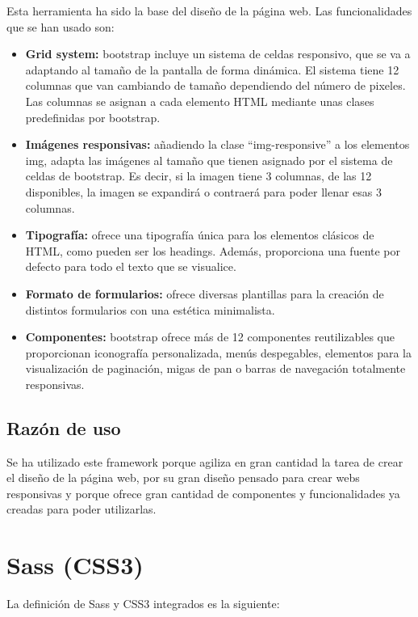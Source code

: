 Esta herramienta ha sido la base del diseño de la página web. Las funcionalidades que se han usado son:
\begin{itemize}
	\item \textbf{Grid system:} bootstrap incluye un sistema de celdas responsivo, que se va a adaptando al tamaño de la pantalla de forma dinámica. El sistema tiene 12 columnas que van cambiando de tamaño dependiendo del número de pixeles. Las columnas se asignan a cada elemento HTML mediante unas clases predefinidas por bootstrap. 	
	\item \textbf{Imágenes responsivas:} añadiendo la clase “img-responsive” a los elementos img, adapta las imágenes al tamaño que tienen asignado por el sistema de celdas de	bootstrap. Es decir, si la imagen tiene 3 columnas, de las 12 disponibles, la imagen se	expandirá o contraerá para poder llenar esas 3 columnas.
	\item \textbf{Tipografía:} ofrece una tipografía única para los elementos clásicos de HTML, como pueden ser los headings. Además, proporciona una fuente por defecto para todo el texto que se visualice.
	\item \textbf{Formato de formularios:} ofrece diversas plantillas para la creación de distintos formularios con una estética minimalista.
	\item \textbf{Componentes:} bootstrap ofrece más de 12 componentes reutilizables que proporcionan iconografía personalizada, menús despegables, elementos para la visualización de paginación, migas de pan o barras de navegación totalmente responsivas.
\end{itemize}

\subsection{Razón de uso}
Se ha utilizado este framework porque agiliza en gran cantidad la tarea de crear el diseño de la página web, por su gran diseño pensado para crear webs responsivas y porque ofrece gran cantidad de componentes y funcionalidades ya creadas para poder utilizarlas.

\section{Sass (CSS3)}
La definición de Sass\cite{sass} y CSS3\cite{css} integrados es la siguiente:

